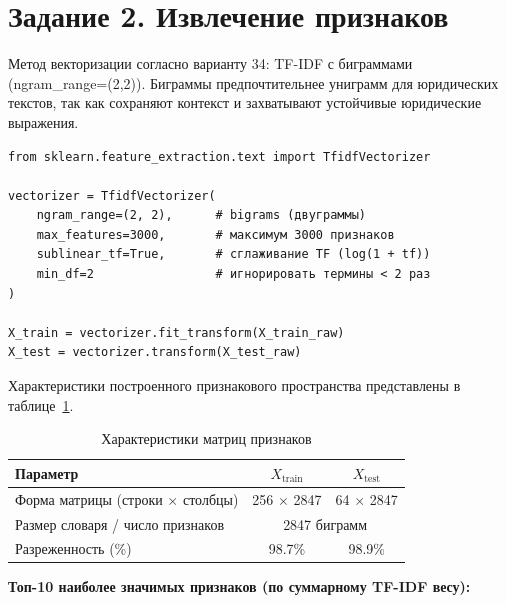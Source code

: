 \documentclass[12pt, a4paper]{report}
\begin{document}
\section{Задание 2. Извлечение признаков}

Метод векторизации согласно варианту 34: TF-IDF с биграммами (ngram\_range=(2,2)).
Биграммы предпочтительнее униграмм для юридических текстов, так как сохраняют
контекст и захватывают устойчивые юридические выражения.

\begin{lstlisting}[caption={Настройка и обучение векторизатора}]
from sklearn.feature_extraction.text import TfidfVectorizer

vectorizer = TfidfVectorizer(
    ngram_range=(2, 2),      # bigrams (двуграммы)
    max_features=3000,       # максимум 3000 признаков
    sublinear_tf=True,       # сглаживание TF (log(1 + tf))
    min_df=2                 # игнорировать термины < 2 раз
)

X_train = vectorizer.fit_transform(X_train_raw)
X_test = vectorizer.transform(X_test_raw)
\end{lstlisting}

Характеристики построенного признакового пространства представлены в
таблице~\ref{tab:feature_space}.

\begin{table}[h]
  \centering
  \caption{Характеристики матриц признаков}
  \label{tab:feature_space}
  \begin{tabularx}{0.85\textwidth}{X c c}
    \toprule
    \rowcolor{LightBlue}
    \textsf{\textbf{Параметр}} &
    \textsf{\textbf{$X_{\text{train}}$}} &
    \textsf{\textbf{$X_{\text{test}}$}} \\
    \midrule
    Форма матрицы (строки $\times$ столбцы) & 256 $\times$ 2847 & 64 $\times$ 2847 \\
    Размер словаря / число признаков        & \multicolumn{2}{c}{2847 биграмм} \\
    Разреженность (\%)                      & 98.7\% & 98.9\% \\
    \bottomrule
  \end{tabularx}
\end{table}

\textbf{Топ-10 наиболее значимых признаков (по суммарному TF-IDF весу):}
\end{document}
